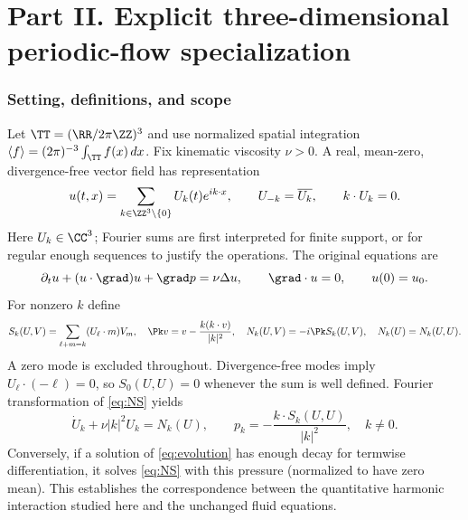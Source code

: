 \part*{Part II. Explicit three-dimensional periodic-flow specialization}

\section{Setting, definitions, and scope}
Let $\TT=(\RR/2\pi\ZZ)^3$ and use normalized spatial integration $\langle f\rangle=(2\pi)^{-3}\int_{\TT}f(x)\,dx$. Fix kinematic viscosity $\nu>0$. A real, mean-zero, divergence-free vector field has representation
\begin{equation}\label{eq:series}
u(t,x)=\sum_{k\in\ZZ^3\setminus\{0\}}U_k(t)e^{ik\cdot x},\qquad U_{-k}=\overline{U_k},\qquad k\cdot U_k=0.
\end{equation}
Here $U_k\in\CC^3$; Fourier sums are first interpreted for finite support, or for regular enough sequences to justify the operations. The original equations are
\begin{equation}\label{eq:NS}
\partial_tu+(u\cdot\grad)u+\grad p=\nu\Delta u,\qquad \grad\cdot u=0,\qquad u(0)=u_0.
\end{equation}
For nonzero $k$ define
\begin{equation}\label{eq:phase}
S_k(U,V)=\sum_{\ell+m=k}(U_\ell\cdot m)V_m,\quad
\Pk v=v-\frac{k(k\cdot v)}{|k|^2},\quad
N_k(U,V)=-i\Pk S_k(U,V),\quad N_k(U)=N_k(U,U).
\end{equation}
A zero mode is excluded throughout. Divergence-free modes imply $U_\ell\cdot(-\ell)=0$, so $S_0(U,U)=0$ whenever the sum is well defined. Fourier transformation of \eqref{eq:NS} yields
\begin{equation}\label{eq:evolution}
\dot U_k+\nu|k|^2U_k=N_k(U),\qquad
p_k=-\frac{k\cdot S_k(U,U)}{|k|^2},\quad k\ne0.
\end{equation}
Conversely, if a solution of \eqref{eq:evolution} has enough decay for termwise differentiation, it solves \eqref{eq:NS} with this pressure (normalized to have zero mean). This establishes the correspondence between the quantitative harmonic interaction studied here and the unchanged fluid equations.

